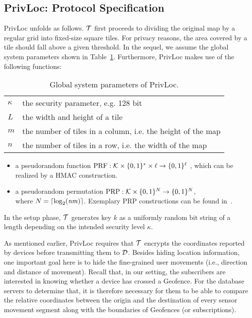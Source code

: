 \documentclass{llncs}
\DeclarePairedDelimiter{\ceil}{\lceil}{\rceil}
\newcommand\SECPAR{\kappa}
\newcommand\sol{{\sf PrivLoc}}
\newcommand\MK{\mathit{k}}
\newcommand\LENGTH{\mathit{L}}
\newcommand\COLUMNS{\mathit{m}}
\newcommand\ROWS{\mathit{n}}
\begin{document}
\subsection{PrivLoc: Protocol Specification}\label{subsec:spec}

\sol{} unfolds as follows. $\cal T$ first proceeds to dividing the original map by a regular grid into fixed-size square tiles. For privacy reasons, the area covered by a tile should fall above a given threshold. In the sequel, we assume the global system parameters shown in Table~\ref{tab:parameters}. Furthermore, \sol{} makes use of the following functions:

\begin{table}[tbp]
\centering
\begin{tabular}{l | p{}}
\hline
$\SECPAR$ & the security parameter, e.g. 128 bit\\
$\LENGTH$ & the width and height of a tile\\
$\COLUMNS$& the number of tiles in a column, i.e. the height of the map\\
$\ROWS$ & the number of tiles in a row, i.e. the width of the map\\
\hline
\end{tabular}
\caption{Global system parameters of \sol.}
\label{tab:parameters}
\vspace{-1.5 em}
\end{table}


\begin{itemize}
\item a pseudorandom function $\mathrm{PRF}: {\cal K} \times \{0,1\}^* \times \ell \rightarrow \{0,1\}^\ell$ , which can be realized by a HMAC construction.
\item a pseudorandom permutation $\mathrm{PRP}: {\cal K} \times \{0,1\}^N \rightarrow \{0,1\}^N$,\\where $N=\ceil{\log_2(\ROWS \COLUMNS)}$. Exemplary PRP constructions can be found in~\cite{black2002ciphers}.
\end{itemize}

In the setup phase, $\cal T$ generates key $\MK$ as a uniformly random bit string of a length depending on the intended security level $\SECPAR$. 




As mentioned earlier, \sol{} requires that $\cal T$ encrypts the coordinates reported by devices before transmitting them to $\cal D$. Besides hiding location information, one important goal here is to
hide the fine-grained user movements (i.e., direction and distance of movement).
Recall that, in our setting, the subscribers are interested in knowing whether a device has crossed a Geofence. For the database servers to determine that, it is therefore
necessary for them to be able to compare the relative coordinates between the origin and the destination of every sensor movement segment along with the boundaries of Geofences (or subscriptions).
\end{document}

